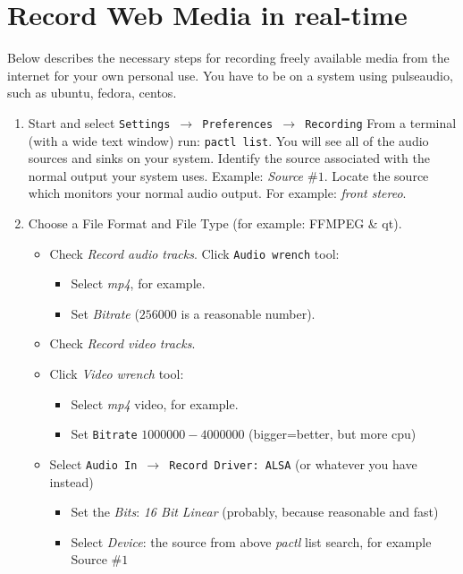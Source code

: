 \section{Record Web Media in real-time}%
\label{sec:record_web_media_rt}

Below describes the necessary steps for recording freely available media from the internet for your own personal use.  You have to be on a system using pulseaudio, such as ubuntu, fedora, centos.

\begin{enumerate}
    \item Start \CGG{} and select \texttt{Settings $\rightarrow$ Preferences $\rightarrow$  Recording} From a terminal (with a wide text window) run: \texttt{pactl list}. You will see all of the audio sources and sinks on your system. Identify the source associated with the normal output your system uses. Example: \textit{Source $\#1$}. Locate the source which monitors your normal audio output.  For example: \textit{front stereo}.        
    \item Choose a File Format and File Type (for example: FFMPEG \& qt).
    \begin{itemize}
        \item Check \textit{Record audio tracks}.
        Click \texttt{Audio wrench} tool:
        \begin{itemize}
            \item Select \textit{mp4}, for example.
            \item Set \textit{Bitrate} ($256000$ is a reasonable number).
        \end{itemize}
        \item Check \textit{Record video tracks}.
        \item Click \textit{Video wrench} tool:
        \begin{itemize}
            \item Select \textit{mp4} video, for example.
            \item Set \texttt{Bitrate} $1000000 - 4000000$ (bigger=better, but more cpu)
        \end{itemize}
        \item Select \texttt{Audio In $\rightarrow$ Record Driver:  ALSA} (or whatever you have instead)
        \begin{itemize}
            \item Set the \textit{Bits}: \textit{16 Bit Linear} (probably, because reasonable and fast)
            \item Select \textit{Device}: the source from above \textit{pactl} list search, for example Source $\#1$

\end{itemize}
\end{itemize}
\end{enumerate}
